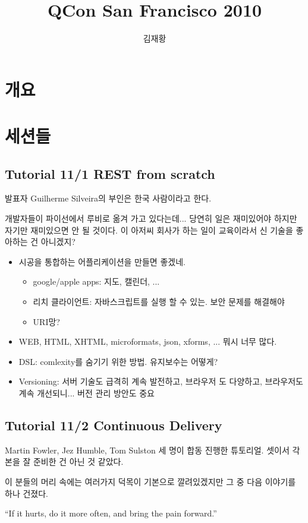 \documentclass[a4paper]{article}
\title{QCon San Francisco 2010}
\author{김재황}
\begin{document}
\section{개요}

\section{세션들}

\subsection{Tutorial 11/1 REST from scratch}
 
발표자 Guilherme Silveira의 부인은 한국 사람이라고 한다.
 
개발자들이 파이선에서 루비로 옮겨 가고 있다는데... 당연히 일은
재미있어야 하지만 자기만 재미있으면 안 될 것이다. 이 아저씨 회사가 하는
일이 교육이라서 신 기술을 좋아하는 건 아니겠지?
\begin{itemize}
\item 시공을 통합하는 어플리케이션을 만들면 좋겠네.
  \begin{itemize}
  \item google/apple apps: 지도, 캘린더, ...
  \item 리치 클라이언트: 자바스크립트를 실행 할 수 있는. 보안 문제를
    해결해야
  \item URI망?
  \end{itemize}
\item  WEB, HTML, XHTML, microformats, json, xforms, ... 뭐시 너무 많다.
\item DSL: comlexity를 숨기기 위한 방법. 유지보수는 어떻게?
\item Versioning: 서버 기술도 급격히 계속 발전하고, 브라우저 도
  다양하고, 브라우저도 계속 개선되니... 버전 관리 방안도 중요
\end{itemize}

\subsection{Tutorial 11/2 Continuous Delivery}

Martin Fowler, Jez Humble, Tom Sulston 세 명이 합동 진행한 튜토리얼.
셋이서 각본을 잘 준비한 건 아닌 것 같았다.
 
이 분들의 머리 속에는 여러가지 덕목이 기본으로 깔려있겠지만 그 중 다음
이야기를 하나 건졌다.
 
``If it hurts, do it more often, and bring the pain forward.''
 
\end{document}
